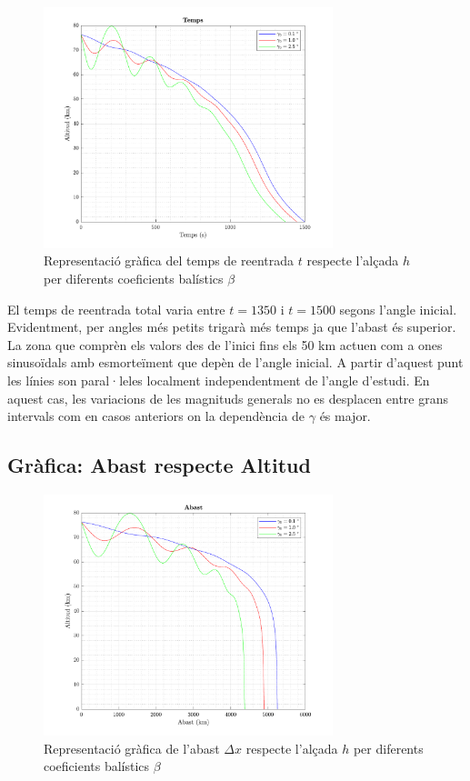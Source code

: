 \begin{figure}[ht]
    \centering
    \includegraphics[width=0.75\textwidth]{imagenes/02_lifting_graficas/temps.pdf}
    \caption{Representació gràfica del temps de reentrada $t$ respecte l'alçada $h$ per diferents coeficients balístics $\beta$}
    \label{fig:temps_lift}
\end{figure}

El temps de reentrada total varia entre $t=1350$ i $t=1500$ segons l'angle inicial. Evidentment, per angles més petits trigarà més temps ja que l'abast és superior. La zona que comprèn els valors des de l'inici fins els 50 km actuen com a ones sinusoïdals amb esmorteïment que depèn de l'angle inicial. A partir d'aquest punt les línies son paral·leles localment independentment de l'angle d'estudi. En aquest cas, les variacions de les magnituds generals no es desplacen entre grans intervals com en casos anteriors on la dependència de $\gamma$ és major.

\newpage
\subsection{Gràfica: Abast respecte Altitud}

\begin{figure}[ht]
    \centering
    \includegraphics[width=0.75\textwidth]{imagenes/02_lifting_graficas/abast.pdf}
    \caption{Representació gràfica de l'abast $\Delta x$ respecte l'alçada $h$ per diferents coeficients balístics $\beta$}
    \label{fig:abast_lift}
\end{figure}

